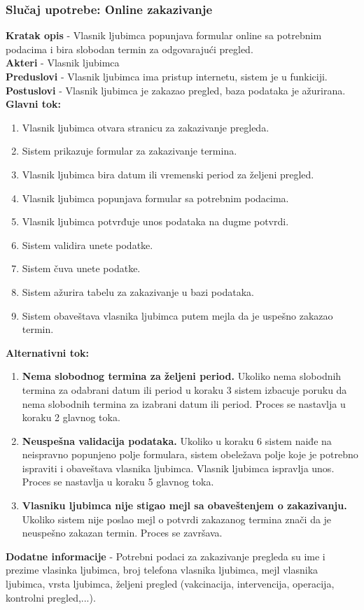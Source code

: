 \subsubsection{Slučaj upotrebe: Online zakazivanje}
\indent \textbf{Kratak opis} - Vlasnik ljubimca popunjava formular online sa potrebnim podacima i bira slobodan termin za odgovarajući pregled.\\
\indent \textbf{Akteri} - Vlasnik ljubimca \\
\indent \textbf{Preduslovi} - Vlasnik ljubimca ima pristup internetu, sistem je u funkiciji. \\
\indent \textbf{Postuslovi} - Vlasnik ljubimca je zakazao pregled, baza podataka je ažurirana. \\
\indent \textbf{Glavni tok:} 
\begin{enumerate}
 \item [1.] Vlasnik ljubimca otvara stranicu za zakazivanje pregleda.
 \item[2.] Sistem prikazuje formular za zakazivanje termina.
 \item[3.] Vlasnik ljubimca bira datum ili vremenski period za željeni pregled.
 \item[4.] Vlasnik ljubimca popunjava formular sa potrebnim podacima.
 \item[5.] Vlasnik ljubimca potvrđuje unos podataka na dugme potvrdi.
 \item[6.] Sistem validira unete podatke.
 \item[7.] Sistem čuva unete podatke.
 \item[8.] Sistem ažurira tabelu za zakazivanje u bazi podataka.
 \item[9.] Sistem obaveštava vlasnika ljubimca putem mejla da je uspešno zakazao termin.
\end{enumerate}
\indent \textbf{Alternativni tok:}
\begin{enumerate}
 \item [A1.]\textbf{Nema slobodnog termina za željeni period.} Ukoliko nema slobodnih termina za odabrani datum ili period u koraku 3 sistem izbacuje poruku da nema slobodnih termina za izabrani datum ili period. Proces se nastavlja u koraku 2 glavnog toka.
 \item [A2.]\textbf{Neuspešna validacija podataka.} Ukoliko u koraku 6 sistem naiđe na neispravno popunjeno polje formulara, sistem obeležava polje koje je potrebno ispraviti i obaveštava vlasnika ljubimca. Vlasnik ljubimca ispravlja unos. Proces se nastavlja u koraku 5 glavnog toka.
 \item[A3.]\textbf{Vlasniku ljubimca nije stigao mejl sa obaveštenjem o zakazivanju.} Ukoliko sistem nije poslao mejl o potvrdi zakazanog termina znači da je neuspešno zakazan termin. Proces se završava.
\end{enumerate}
\indent \textbf{Dodatne informacije} - Potrebni podaci za zakazivanje pregleda su ime i prezime vlasinka ljubimca, broj telefona vlasnika ljubimca, mejl vlasnika ljubimca, vrsta ljubimca, željeni pregled (vakcinacija, intervencija, operacija, kontrolni pregled,...). \\


